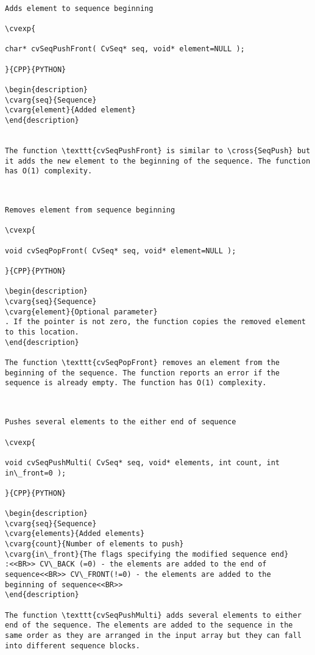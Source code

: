 \begin{verbatim}

Adds element to sequence beginning

\cvexp{

char* cvSeqPushFront( CvSeq* seq, void* element=NULL );

}{CPP}{PYTHON}

\begin{description}
\cvarg{seq}{Sequence}
\cvarg{element}{Added element}
\end{description}


The function \texttt{cvSeqPushFront} is similar to \cross{SeqPush} but it adds the new element to the beginning of the sequence. The function has O(1) complexity.


\end{verbatim}
\begin{verbatim}

Removes element from sequence beginning

\cvexp{

void cvSeqPopFront( CvSeq* seq, void* element=NULL );

}{CPP}{PYTHON}

\begin{description}
\cvarg{seq}{Sequence}
\cvarg{element}{Optional parameter}
. If the pointer is not zero, the function copies the removed element to this location.
\end{description}

The function \texttt{cvSeqPopFront} removes an element from the beginning of the sequence. The function reports an error if the sequence is already empty. The function has O(1) complexity.


\end{verbatim}
\begin{verbatim}

Pushes several elements to the either end of sequence

\cvexp{

void cvSeqPushMulti( CvSeq* seq, void* elements, int count, int in\_front=0 );

}{CPP}{PYTHON}

\begin{description}
\cvarg{seq}{Sequence}
\cvarg{elements}{Added elements}
\cvarg{count}{Number of elements to push}
\cvarg{in\_front}{The flags specifying the modified sequence end}
:<<BR>> CV\_BACK (=0) - the elements are added to the end of sequence<<BR>> CV\_FRONT(!=0) - the elements are added to the beginning of sequence<<BR>>
\end{description}

The function \texttt{cvSeqPushMulti} adds several elements to either end of the sequence. The elements are added to the sequence in the same order as they are arranged in the input array but they can fall into different sequence blocks.


\end{verbatim}
